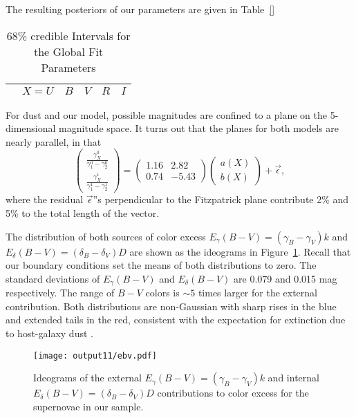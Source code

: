 \documentclass{aastex61}   	%
\begin{document}
The resulting posteriors of our parameters are given in Table~\ref{}
\begin{table}
\centering
\begin{tabular}{|c|c|c|c|c|c|}
\hline
& $X=U$ &$B$&$V$&$R$&$I$\\ \hline
\hline
\end{tabular}
\caption{68\% credible Intervals for the Global Fit Parameters \label{global2:tab}}
\end{table}

For dust and our model, possible magnitudes are confined to a plane on the 5-dimensional magnitude space.
It turns out that the planes for both models are nearly parallel, in that
\begin{equation}
\begin{pmatrix}
 \frac{\gamma^0_X}{\gamma^0_1-\gamma^0_2} \\
\frac{\gamma^1_X}{\gamma^1_1-\gamma^1_2} 
\end{pmatrix}=
\begin{pmatrix}
1.16 & 2.82 \\
0.74 & -5.43
\end{pmatrix} 
\begin{pmatrix}
a(X) \\
b(X)
\end{pmatrix}+
\vec{\epsilon},
\end{equation}
where the residual $\vec{\epsilon}$''s perpendicular to the Fitzpatrick plane
contribute  2\% and 5\% to the total  length of the vector.

The distribution of both sources of color excess $E_\gamma(B-V) =(\gamma_B-\gamma_V)k$ and
 $E_\delta(B-V) = (\delta_B-\delta_V)D$ are shown as the ideograms in Figure~\ref{ebv:fig}.
Recall that our boundary conditions set the means of both distributions to zero. 
The standard deviations of $E_\gamma(B-V)$ and $E_\delta(B-V)$ are
0.079
and 0.015
mag respectively.
The range of $B-V$ colors is $\sim 5$ times larger for the external contribution. 
Both distributions are non-Gaussian with sharp rises in the blue and extended tails in the red, consistent
with the expectation for extinction due to host-galaxy dust \citep{1998ApJ...502..177H}.

\begin{figure}[htbp] %
   \centering
   \texttt{[image: output11/ebv.pdf]}
   \caption{Ideograms of the external $E_\gamma(B-V) =(\gamma_B-\gamma_V)k$ and
   internal $E_\delta(B-V) = (\delta_B-\delta_V)D$  contributions to color excess  for the supernovae in our sample.
   \label{ebv:fig}}
\end{figure}
\end{document}
